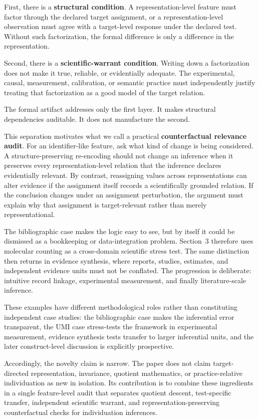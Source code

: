 \documentclass[11pt]{article}
\begin{document}
First, there is a \textbf{structural condition}. A representation-level feature must factor through the declared target assignment, or a representation-level observation must agree with a target-level response under the declared test. Without such factorization, the formal difference is only a difference in the representation.

Second, there is a \textbf{scientific-warrant condition}. Writing down a factorization does not make it true, reliable, or evidentially adequate. The experimental, causal, measurement, calibration, or semantic practice must independently justify treating that factorization as a good model of the target relation.

The formal artifact addresses only the first layer. It makes structural dependencies auditable. It does not manufacture the second.

This separation motivates what we call a practical \textbf{counterfactual relevance audit}. For an identifier-like feature, ask what kind of change is being considered. A structure-preserving re-encoding should not change an inference when it preserves every representation-level relation that the inference declares evidentially relevant. By contrast, reassigning values across representations can alter evidence if the assignment itself records a scientifically grounded relation. If the conclusion changes under an assignment perturbation, the argument must explain why that assignment is target-relevant rather than merely representational.

The bibliographic case makes the logic easy to see, but by itself it could be dismissed as a bookkeeping or data-integration problem. Section~3 therefore uses molecular counting as a cross-domain scientific stress test. The same distinction then returns in evidence synthesis, where reports, studies, estimates, and independent evidence units must not be conflated. The progression is deliberate: intuitive record linkage, experimental measurement, and finally literature-scale inference.

These examples have different methodological roles rather than constituting independent case studies: the bibliographic case makes the inferential error transparent, the UMI case stress-tests the framework in experimental measurement, evidence synthesis tests transfer to larger inferential units, and the later construct-level discussion is explicitly prospective.

Accordingly, the novelty claim is narrow. The paper does not claim target-directed representation, invariance, quotient mathematics, or practice-relative individuation as new in isolation. Its contribution is to combine these ingredients in a single feature-level audit that separates quotient descent, test-specific transfer, independent scientific warrant, and representation-preserving counterfactual checks for individuation inferences.
\end{document}
